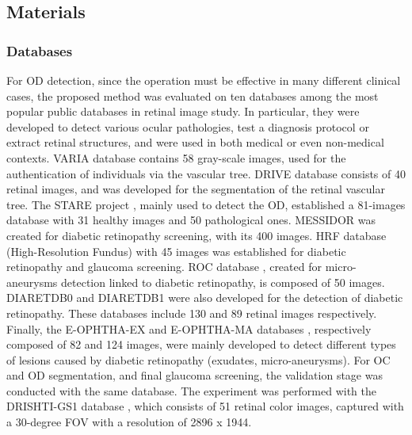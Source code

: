 \subsection{Materials}

\subsubsection{Databases}

For OD detection, since the operation must be effective in many different clinical cases, the proposed method was evaluated on ten databases among the most popular public databases in retinal image study. In particular, they were developed to detect various ocular pathologies, test a diagnosis protocol or extract retinal structures, and were used in both medical or even non-medical contexts.
VARIA \citep{varia,varia2} database contains 58 gray-scale images, used for the authentication of individuals via the vascular tree. DRIVE database \citep{drive} consists of 40 retinal images, and was developed for the segmentation of the retinal vascular tree. The STARE project \citep{stare,stare2}, mainly used to detect the OD, established a 81-images database with 31 healthy images and 50 pathological ones. MESSIDOR \citep{messidor} was created for diabetic retinopathy screening, with its 400 images. HRF database (High-Resolution Fundus) \citep {hrf} with 45 images was established for diabetic retinopathy and glaucoma screening. ROC database \citep{roc}, created for micro-aneurysms detection linked to diabetic retinopathy, is composed of 50 images. DIARETDB0 \citep{diaretdb0} and DIARETDB1 \citep{diaretdb1} were also developed for the detection of diabetic retinopathy. These databases include 130 and 89 retinal images respectively. 
Finally, the E-OPHTHA-EX and E-OPHTHA-MA databases \citep{eophtha}, respectively composed of 82 and 124 images, were mainly developed to detect different types of lesions caused by diabetic retinopathy (exudates, micro-aneurysms).
\bigbreak
For OC and OD segmentation, and final glaucoma screening, the validation stage was conducted with the same database. 
The experiment was performed with the DRISHTI-GS1 database \citep{sivaswamy2014drishti, drishti}, which consists of 51 retinal color images, captured with a 30-degree FOV with a resolution of 2896 x 1944. 
